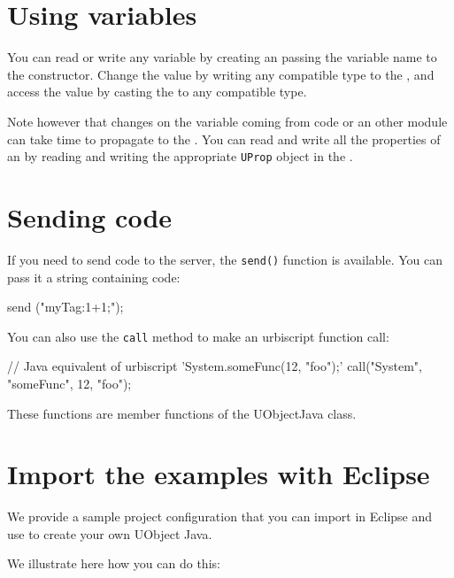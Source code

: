\section{Using \urbi variables}
\label{sec:uob:apijava:uvar}

You can read or write any \urbi variable by creating an
\UVar passing the variable name to the constructor. Change
the value by writing any compatible type to the \UVar, and
access the value by casting the \UVar to any compatible
type.

Note however that changes on the
variable coming from \urbi code or an other module can take time to propagate
to the \UVar.
You can read and write all the \urbi properties of an \UVar by
reading and writing the appropriate \lstinline{UProp} object in the
\UVar.

\section{Sending \urbi code}
\label{sec:uob:apijava:sendcode}

If you need to send \urbi code to the server, the \lstinline{send()} function
is available. You can pass it a string containing \urbi code:

\begin{urbiunchecked}
send ("myTag:1+1;");
\end{urbiunchecked}

You can also use the \lstinline{call} method to make an urbiscript function
call:

\begin{urbiunchecked}
// Java equivalent of urbiscript 'System.someFunc(12, "foo");'
call("System", "someFunc", 12, "foo");
\end{urbiunchecked}

These functions are member functions of the UObjectJava class.

\section{Import the examples with Eclipse}
\label{sec:uob:apijava:import}

We provide a sample  project configuration that
you can import in Eclipse and use to create your own UObject Java.

We illustrate here how you can do this:

